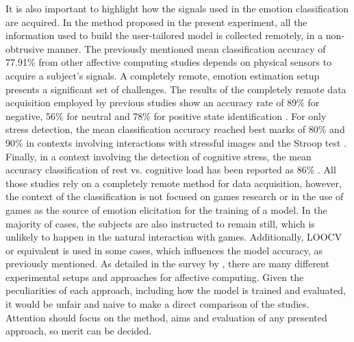 It is also important to highlight how the signals used in the emotion classification are acquired. In the method proposed in the present experiment, all the information used to build the user-tailored model is collected remotely, in a non-obtrusive manner. The previously mentioned mean classification accuracy of 77.91\% from other affective computing studies depends on physical sensors to acquire a subject's signals. A completely remote, emotion estimation setup presents a significant set of challenges. The results of the completely remote data acquisition employed by previous studies show an accuracy rate of 89\% for negative, 56\% for neutral and 78\% for positive state identification \parencite{mental}. For only stress detection, the mean classification accuracy reached best marks of 80\% and 90\% in contexts involving interactions with stressful images and the Stroop test \parencite{giannakakis2017stress}. Finally, in a context involving the detection of cognitive stress, the mean accuracy classification of rest vs. cognitive load has been reported as 86\% \parencite{mcduffcogcam}. All those studies rely on a completely remote method for data acquisition, however, the context of the classification is not focused on games research or in the use of games as the source of emotion elicitation for the training of a model. In the majority of cases, the subjects are also instructed to remain still, which is unlikely to happen in the natural interaction with games. Additionally, LOOCV or equivalent is used in some cases, which influences the model accuracy, as previously mentioned. As detailed in the survey by \textcite{moghimi2017affective}, there are many different experimental setups and approaches for affective computing. Given the peculiarities of each approach, including how the model is trained and evaluated, it would be unfair and naive to make a direct comparison of the studies. Attention should focus on the method, aims and evaluation of any presented approach, so merit can be decided.

